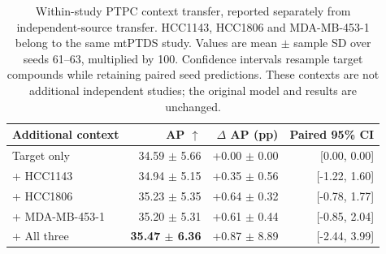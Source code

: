 \begin{table}[htbp]
\caption{Within-study PTPC context transfer, reported separately from independent-source transfer. HCC1143, HCC1806 and MDA-MB-453-1 belong to the same mtPTDS study. Values are mean $\pm$ sample SD over seeds 61--63, multiplied by 100. Confidence intervals resample target compounds while retaining paired seed predictions. These contexts are not additional independent studies; the original model and results are unchanged.}
\label{tab:completed-context-transfer}
\centering\small
\setlength{\tabcolsep}{4pt}
\begin{tabularx}{\linewidth}{@{}Xrrr@{}}
\toprule
Additional context & AP $\uparrow$ & $\Delta$ AP (pp) & Paired 95\% CI \\
\midrule
Target only & 34.59 $\pm$ 5.66 & +0.00 $\pm$ 0.00 & [0.00, 0.00] \\
+ HCC1143 & 34.94 $\pm$ 5.15 & +0.35 $\pm$ 0.56 & [-1.22, 1.60] \\
+ HCC1806 & 35.23 $\pm$ 5.35 & +0.64 $\pm$ 0.32 & [-0.78, 1.77] \\
+ MDA-MB-453-1 & 35.20 $\pm$ 5.31 & +0.61 $\pm$ 0.44 & [-0.85, 2.04] \\
+ All three & \textbf{35.47 $\pm$ 6.36} & +0.87 $\pm$ 8.89 & [-2.44, 3.99] \\
\bottomrule
\end{tabularx}
\end{table}

